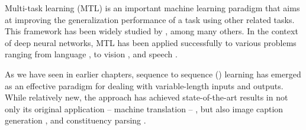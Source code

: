 Multi-task learning (MTL) is an important machine learning paradigm that
aims at improving the generalization performance of a task using other related
tasks. 
This framework has been widely studied by
, among many
others. In the context of deep neural networks, MTL has
been applied successfully to various problems ranging from language
\cite{liu15}, to vision
\cite{donahue14},
and speech \cite{heigold13,huang2013cross}.

\begin{sloppypar}
As we have seen in earlier chapters, sequence to sequence (\ssl{}) learning
\cite{kal13,sutskever14,cho14} has emerged as an effective paradigm for dealing with
variable-length inputs and outputs. 
While relatively new, the \ssl{}
approach has achieved state-of-the-art results in not only its original
application -- machine translation --
\cite{luong15,jean15,luong15attn,jean15wmt,luong15iwslt}, but also image caption generation \cite{vinyals15caption},
and constituency parsing \cite{vinyals15grammar}. 
\end{sloppypar}

